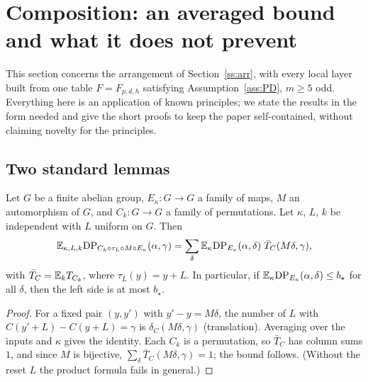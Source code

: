 \section{Composition: an averaged bound and what it does not prevent}\label{sec:comp}

This section concerns the arrangement of Section~\ref{ss:arr}, with every local layer built from one
table $F=F_{p,d,h}$ satisfying Assumption~\ref{ass:PD}, $m\ge5$ odd. Everything here is an
application of known principles; we state the results in the form needed and give the short proofs to
keep the paper self-contained, without claiming novelty for the principles.

\subsection{Two standard lemmas}
\begin{lemma}\label{lem:reset}
Let $G$ be a finite abelian group, $E_\kappa:G\to G$ a family of maps, $M$ an automorphism of $G$, and
$C_k:G\to G$ a family of permutations. Let $\kappa$, $L$, $k$ be independent with $L$ uniform on $G$. Then
\[
\mathbb{E}_{\kappa,L,k}\mathrm{DP}_{C_k\circ\tau_L\circ M\circ E_\kappa}(\alpha,\gamma)
=\sum_{\delta}\mathbb{E}_\kappa\mathrm{DP}_{E_\kappa}(\alpha,\delta)\;\bar T_C(M\delta,\gamma),
\]
with $\bar T_C=\mathbb{E}_k T_{C_k}$,
where $\tau_L(y)=y+L$. In particular, if $\mathbb{E}_\kappa\mathrm{DP}_{E_\kappa}(\alpha,\delta)\le b_\star$ for all $\delta$, then the
left side is at most $b_\star$.
\end{lemma}
\begin{proof}
For a fixed pair $(y,y')$ with $y'-y=M\delta$, the number of $L$ with $C(y'+L)-C(y+L)=\gamma$ is
$\delta_C(M\delta,\gamma)$ (translation). Averaging over the inputs and $\kappa$ gives the identity. Each
$C_k$ is a permutation, so $\bar T_C$ has column sums $1$, and since $M$ is bijective,
$\sum_\delta\bar T_C(M\delta,\gamma)=1$; the bound follows. (Without the reset $L$ the product formula fails in
general.)
\end{proof}

